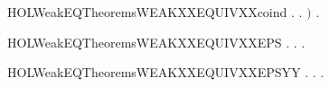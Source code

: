 \begin{SaveVerbatim}{HOLWeakEQTheoremsWEAKXXEQUIVXXcoind}
            \HOLSymConst{\HOLTokenForall{}}.  \HOLTokenTransBegin\HOLConst{\ensuremath{\tau}}\HOLTokenTransEnd {} \HOLSymConst{\HOLTokenImp{}} \HOLSymConst{\HOLTokenExists{}}.    \HOLSymConst{\HOLTokenConj{}}   \ensuremath{)} \HOLSymConst{\HOLTokenImp{}}
       \HOLSymConst{\HOLTokenForall{}} .    \HOLSymConst{\HOLTokenImp{}}   
\end{SaveVerbatim}
\newcommand{\HOLWeakEQTheoremsWEAKXXEQUIVXXcoind}{\UseVerbatim{HOLWeakEQTheoremsWEAKXXEQUIVXXcoind}}
\begin{SaveVerbatim}{HOLWeakEQTheoremsWEAKXXEQUIVXXEPS}
\HOLTokenTurnstile{} \HOLSymConst{\HOLTokenForall{}} .
          \HOLSymConst{\HOLTokenImp{}}
       \HOLSymConst{\HOLTokenForall{}}.    \HOLSymConst{\HOLTokenImp{}} \HOLSymConst{\HOLTokenExists{}}.    \HOLSymConst{\HOLTokenConj{}}   
\end{SaveVerbatim}
\newcommand{\HOLWeakEQTheoremsWEAKXXEQUIVXXEPS}{\UseVerbatim{HOLWeakEQTheoremsWEAKXXEQUIVXXEPS}}
\begin{SaveVerbatim}{HOLWeakEQTheoremsWEAKXXEQUIVXXEPSYY}
\HOLTokenTurnstile{} \HOLSymConst{\HOLTokenForall{}} .
          \HOLSymConst{\HOLTokenImp{}}
       \HOLSymConst{\HOLTokenForall{}}.    \HOLSymConst{\HOLTokenImp{}} \HOLSymConst{\HOLTokenExists{}}.    \HOLSymConst{\HOLTokenConj{}}   
\end{SaveVerbatim}
